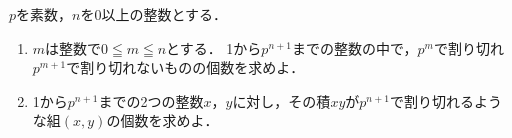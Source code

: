 \documentclass[../../main.tex]{subfiles}
\begin{document}
$p$を素数，$n$を0以上の整数とする．
\begin{enumerate}
  \item $m$は整数で$0 \leqq m \leqq n$とする．
    1から$p^{n+1}$までの整数の中で，$p^m$で割り切れ$p^{m+1}$で割り切れないものの個数を求めよ．
  \item 1から$p^{n+1}$までの2つの整数$x$，$y$に対し，その積$xy$が$p^{n+1}$で割り切れるような組$(x,y)$の個数を求めよ．
\end{enumerate}
\end{document}
